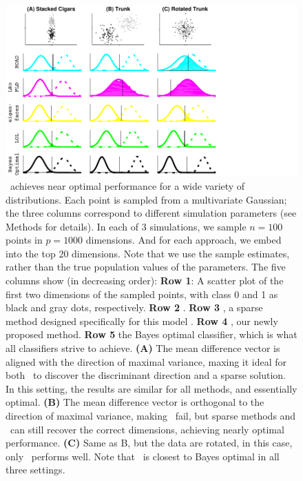 \documentclass[10pt]{article}
\begin{document}
\begin{figure}[h!]%
\centering
\includegraphics[width=0.8\linewidth,trim=0in 0in 1.5in 0in,clip=true]{../Figs/cigars_est.pdf}%
\caption{
\Lol~achieves near optimal performance for a wide variety of distributions.
Each point is sampled from a multivariate Gaussian;
the three columns correspond to different simulation parameters (see Methods for details).
In each of 3 simulations, we sample $n=100$ points in $p=1000$ dimensions.  And for each approach, we embed into the top 20 dimensions. Note that we use the sample estimates, rather than the true population values of the parameters.  The five columns show (in decreasing order):
\textbf{Row 1}: A scatter plot of the first two dimensions of the sampled points, with class 0 and 1 as black and gray dots, respectively.
\textbf{Row 2} .
\textbf{Row 3} \Road, a sparse method designed specifically for this model \cite{Fan2012a}.
\textbf{Row 4} \Lol, our newly proposed method.
\textbf{Row 5} the Bayes optimal classifier, which is what all classifiers strive to achieve.
\textbf{(A)} The mean difference vector is aligned with the direction of maximal variance, maxing it ideal for both \Pca~to discover the discriminant direction and a sparse solution. In this setting, the results are  similar for all methods, and essentially optimal.
\textbf{(B)} The mean difference vector is orthogonal to the direction of maximal variance, making \Pca~fail, but sparse methods and \Lol~can still recover the correct dimensions, achieving nearly optimal performance.
\textbf{(C)} Same as B, but the data are rotated, in this case, only \Lol~performs well.
Note that \Lol~is closest to Bayes optimal in all three settings.
}
\label{f:cigars}
\end{figure}
\end{document}
